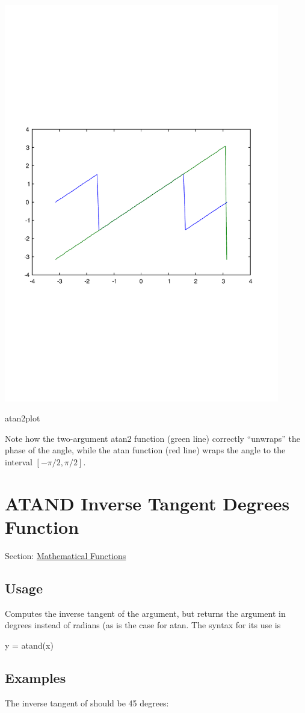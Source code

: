  
\begin{DoxyImage}
\includegraphics[width=12cm]{atan2plot}
\caption{atan2plot}
\end{DoxyImage}
 Note how the two-\/argument {\ttfamily atan2} function (green line) correctly ``unwraps'' the phase of the angle, while the {\ttfamily atan} function (red line) wraps the angle to the interval $[-\pi/2,\pi/2]$. \hypertarget{mathfunctions_atand}{}\section{A\-T\-A\-N\-D Inverse Tangent Degrees Function}\label{mathfunctions_atand}
Section\-: \hyperlink{sec_mathfunctions}{Mathematical Functions} \hypertarget{vtkwidgets_vtkxyplotwidget_Usage}{}\subsection{Usage}\label{vtkwidgets_vtkxyplotwidget_Usage}
Computes the inverse tangent of the argument, but returns the argument in degrees instead of radians (as is the case for {\ttfamily atan}. The syntax for its use is \begin{DoxyVerb}   y = atand(x)
\end{DoxyVerb}
 \hypertarget{variables_matrix_Examples}{}\subsection{Examples}\label{variables_matrix_Examples}
The inverse tangent of {} should be 45 degrees\-:



